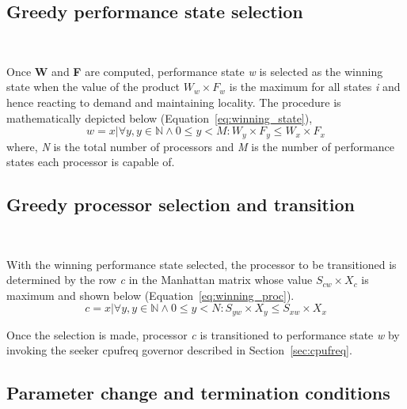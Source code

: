 \subsection{Greedy performance state selection}~\label{sec:winner_state}

Once \textbf{W} and \textbf{F} are computed, performance state \textit{w} is selected
as the winning state when the value of the product $W_w \times F_w$ is the maximum 
for all states \textit{i} and hence reacting to demand and maintaining locality. 
The procedure is mathematically depicted below (Equation~\eqref{eq:winning_state}),
\begin{equation}
    w = {x | \forall y, y \in \mathbb{N} \wedge 0 \leq y < M : W_y \times F_y \leq W_x \times F_x}
\label{eq:winning_state}
\end{equation}
where, \textit{N} is the total number of processors and \textit{M} is the number of
performance states each processor is capable of.

\subsection{Greedy processor selection and transition}~\label{sec:winner_proc}

With the winning performance state selected, the processor to be transitioned
is determined by the row \textit{c} in the Manhattan matrix whose value $S_{cw} \times X_c$ 
is maximum and shown below (Equation~\ref{eq:winning_proc}). 
\begin{equation}
    c = {x | \forall y, y \in \mathbb{N} \wedge 0 \leq y < N : S_{yw} \times X_y \leq S_{xw} \times X_x}
\label{eq:winning_proc}
\end{equation}

Once the selection is made, processor \textit{c} is transitioned to performance state
\textit{w} by invoking the seeker cpufreq governor described in Section~\ref{sec:cpufreq}.


\subsection{Parameter change and termination conditions}~\label{sec:param_adjust}

